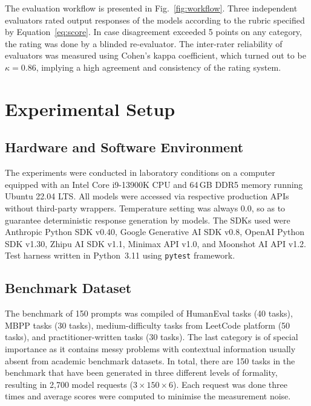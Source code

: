 \documentclass[conference]{IEEEtran}
\begin{document}
The evaluation workflow is presented in Fig.~\ref{fig:workflow}. Three independent evaluators rated output responses of the models according to the rubric specified by Equation~\ref{eq:score}. In case disagreement exceeded 5 points on any category, the rating was done by a blinded re-evaluator. The inter-rater reliability of evaluators was measured using Cohen's kappa coefficient, which turned out to be $\kappa = 0.86$, implying a high agreement and consistency of the rating system.

\section{Experimental Setup}
\label{sec:setup}

\subsection{Hardware and Software Environment}

The experiments were conducted in laboratory conditions on a computer equipped with an Intel Core i9-13900K CPU and 64\,GB DDR5 memory running Ubuntu 22.04 LTS. All models were accessed via respective production APIs without third-party wrappers. Temperature setting was always 0.0, so as to guarantee deterministic response generation by models. The SDKs used were Anthropic Python SDK v0.40, Google Generative AI SDK v0.8, OpenAI Python SDK v1.30, Zhipu AI SDK v1.1, Minimax API v1.0, and Moonshot AI API v1.2. Test harness written in Python~3.11 using \texttt{pytest} framework.

\subsection{Benchmark Dataset}

The benchmark of 150 prompts was compiled of HumanEval tasks \cite{chen2021codex} (40 tasks), MBPP tasks \cite{austin2021mbpp} (30 tasks), medium-difficulty tasks from LeetCode platform (50 tasks), and practitioner-written tasks (30 tasks). The last category is of special importance as it contains messy problems with contextual information usually absent from academic benchmark datasets. In total, there are 150 tasks in the benchmark that have been generated in three different levels of formality, resulting in 2,700 model requests ($3 \times 150 \times 6$). Each request was done three times and average scores were computed to minimise the measurement noise.
\end{document}
